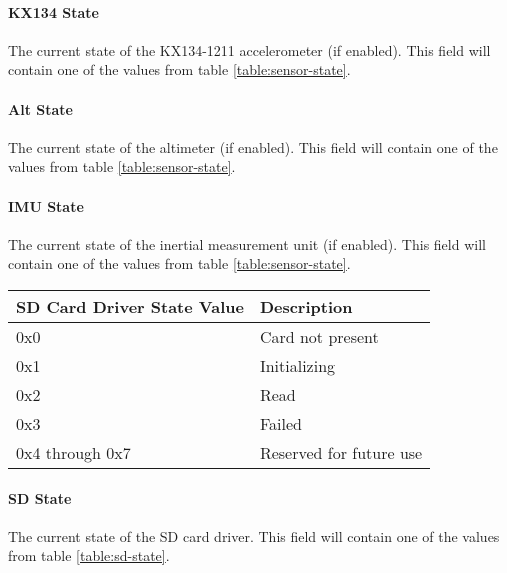 \paragraph{KX134 State}
The current state of the KX134-1211 accelerometer (if enabled). This field will contain one of the values from table
\ref{table:sensor-state}.

\paragraph{Alt State}
The current state of the altimeter (if enabled). This field will contain one of the values from table
\ref{table:sensor-state}.

\paragraph{IMU State}
The current state of the inertial measurement unit (if enabled). This field will contain one of the values from table
\ref{table:sensor-state}.

\begin{table*}[htb]
    \centering
    \begin{tabular}{@{}ll@{}}
        \toprule
        SD Card Driver State Value & Description             \\
        \midrule
        0x0                        & Card not present        \\
        0x1                        & Initializing            \\
        0x2                        & Read                    \\
        0x3                        & Failed                  \\
        0x4 through 0x7            & Reserved for future use \\
        \bottomrule
    \end{tabular}
    \caption{SD Card Driver States}
    \label{table:sd-state}
\end{table*}

\paragraph{SD State}
The current state of the SD card driver. This field will contain one of the values from table \ref{table:sd-state}.


